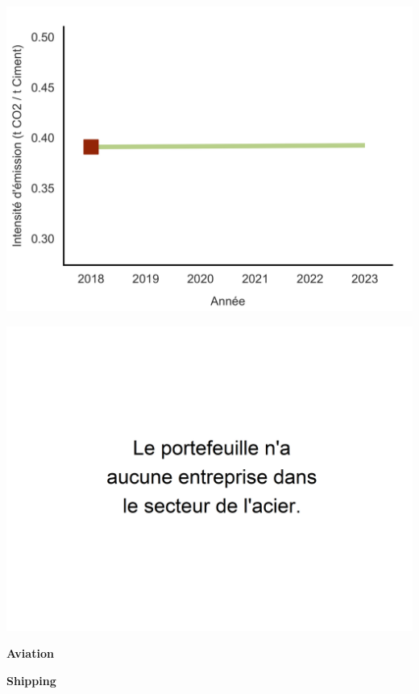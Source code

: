 \documentclass[10pt,table]{article}\usepackage[]{graphicx}\usepackage[]{color}
\begin{document}
	\begin{multicols}{2}

		\includegraphics[width=.9\linewidth]{ReportOutputs/Fig30} \vfill\null \columnbreak

		\includegraphics[width=.9\linewidth]{ReportOutputs/Fig31}

	\end{multicols}

	\begin{multicols}{2}

		\textbf{Aviation}

		\textbf{Shipping}

	\end{multicols}

	\vspace{0cm}
\end{document}
